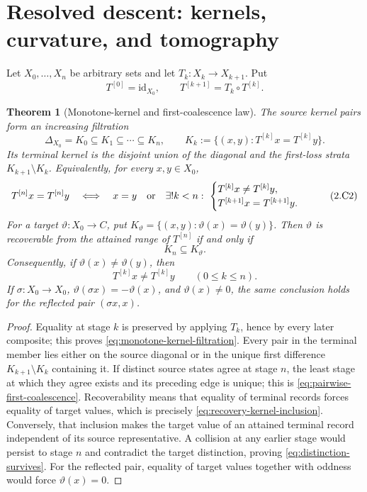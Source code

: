\documentclass[11pt]{article}
\newtheorem{theorem}{Theorem}[section]
\theoremstyle{definition}
\theoremstyle{remark}
\begin{document}
\section{Resolved descent: kernels, curvature, and tomography}

Let \(X_0,\ldots,X_n\) be arbitrary sets and let
\(T_k:X_k\to X_{k+1}\).  Put
\[
 T^{[0]}=\mathrm{id}_{X_0},\qquad
 T^{[k+1]}=T_k\circ T^{[k]}.
\tag{2.C0}\label{eq:iterated-observation-transport}
\]

\begin{theorem}[Monotone-kernel and first-coalescence law]
\label{thm:pairwise-first-coalescence}
The source kernel pairs form an increasing filtration
\[
 \Delta_{X_0}=K_0\subseteq K_1\subseteq\cdots\subseteq K_n,
 \qquad K_k:=\{(x,y):T^{[k]}x=T^{[k]}y\}.
\tag{2.C1}\label{eq:monotone-kernel-filtration}
\]
Its terminal kernel is the disjoint union of the diagonal and the first-loss
strata \(K_{k+1}\setminus K_k\).  Equivalently, for every \(x,y\in X_0\),
\[
 T^{[n]}x=T^{[n]}y
 \quad\Longleftrightarrow\quad
 x=y\quad\hbox{or}\quad
 \exists!k<n:\
 \begin{cases}
 T^{[k]}x\ne T^{[k]}y,\\
 T^{[k+1]}x=T^{[k+1]}y.
 \end{cases}
\tag{2.C2}\label{eq:pairwise-first-coalescence}
\]
For a target \(\vartheta:X_0\to C\), put
\(K_\vartheta=\{(x,y):\vartheta(x)=\vartheta(y)\}\).  Then \(\vartheta\)
is recoverable from the attained range of \(T^{[n]}\) if and only if
\[
                              K_n\subseteq K_\vartheta.
\tag{2.C3}\label{eq:recovery-kernel-inclusion}
\]
Consequently, if \(\vartheta(x)\ne\vartheta(y)\), then
\[
                    T^{[k]}x\ne T^{[k]}y
                    \qquad(0\le k\le n).
\tag{2.C4}\label{eq:distinction-survives}
\]
If \(\sigma:X_0\to X_0\),
\(\vartheta(\sigma x)=-\vartheta(x)\), and \(\vartheta(x)\ne0\), the same
conclusion holds for the reflected pair \((\sigma x,x)\).
\end{theorem}

\begin{proof}
Equality at stage \(k\) is preserved by applying \(T_k\), hence by every
later composite; this proves \eqref{eq:monotone-kernel-filtration}.  Every
pair in the terminal member lies either on the source diagonal or in the
unique first difference \(K_{k+1}\setminus K_k\) containing it.  If distinct
source states agree at stage \(n\), the least
stage at which they agree exists and its preceding edge is unique; this is
\eqref{eq:pairwise-first-coalescence}.  Recoverability means that equality
of terminal records forces equality of target values, which is precisely
\eqref{eq:recovery-kernel-inclusion}.  Conversely, that inclusion makes the
target value of an attained terminal record independent of its source
representative.  A collision at any
earlier stage would persist to stage \(n\) and contradict the target
distinction, proving \eqref{eq:distinction-survives}.  For the reflected
pair, equality of target values together with oddness would force
\(\vartheta(x)=0\).
\end{proof}
\end{document}
